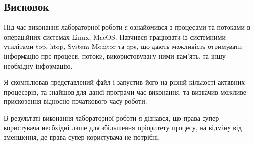 \documentclass{article}
\begin{document}
\begin{normalsize}
	\section*{Висновок}
	Під час виконання лабораторної роботи я ознайомився з процесами та потоками в операційних системах  Linux, MacOS. Навчився працювати із системними утилітами top, htop, System Monitor та qps, що дають можливість отримувати інформацію про процеси, потоки, використовувану ними пам'ять, та іншу необхідну інформацію. 
	
	Я скомпілював представлений файл і запустив його на різній кількості активних процесорів, та знайшов для даної програми час виконання, та визначив можливе прискорення відносно початкового часу роботи.
	
	В результаті виконання лабораторної роботи я дізнався, що права супер-користувача необхідні лише для збільшення пріоритету процесу, на відміну від зменшення, де права супер-користувача не потрібні.    
\end{normalsize}
\end{document}
